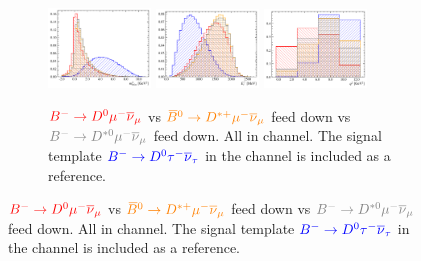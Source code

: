 \begin{figure}[!htb]
    \begin{subfigure}{\textwidth}
        \centering
        \includegraphics[width=0.3\textwidth]{figs-fit-fit-templates/histo-comp/D0_iso_D0Tau__vs__D0_iso_D0Mu__vs__D0_iso_DstMu__vs__D0_iso_Dst0Mu__m2miss.pdf}
        \includegraphics[width=0.3\textwidth]{figs-fit-fit-templates/histo-comp/D0_iso_D0Tau__vs__D0_iso_D0Mu__vs__D0_iso_DstMu__vs__D0_iso_Dst0Mu__el.pdf}
        \includegraphics[width=0.3\textwidth]{figs-fit-fit-templates/histo-comp/D0_iso_D0Tau__vs__D0_iso_D0Mu__vs__D0_iso_DstMu__vs__D0_iso_Dst0Mu__q2.pdf}
        \caption{
            $\textcolor{red}{{{{B}^-}} \rightarrow {\ensuremath{{D}^0}}{\ensuremath{\mu^-}}{\ensuremath{{\overline{\nu}}_\mu}}}$
            vs
            $\textcolor{orange}{{{\kern 0.18em\overline{\kern -0.18em B}}{}^0} \rightarrow {\ensuremath{{D}^{*+}}}{\ensuremath{\mu^-}}{\ensuremath{{\overline{\nu}}_\mu}}}$ feed down
            vs
            $\textcolor{gray}{\Bm \rightarrow \Dstarz\mun\neumb}$ feed down.
            All in \Dz channel.
            The signal template
            $\textcolor{blue}{{{{B}^-}} \rightarrow {\ensuremath{{D}^0}}{\ensuremath{\tau^-}}{\ensuremath{{\overline{\nu}}_\tau}}}$
            in the \Dz channel is included as a reference.
        }
    \end{subfigure}


\end{figure}
